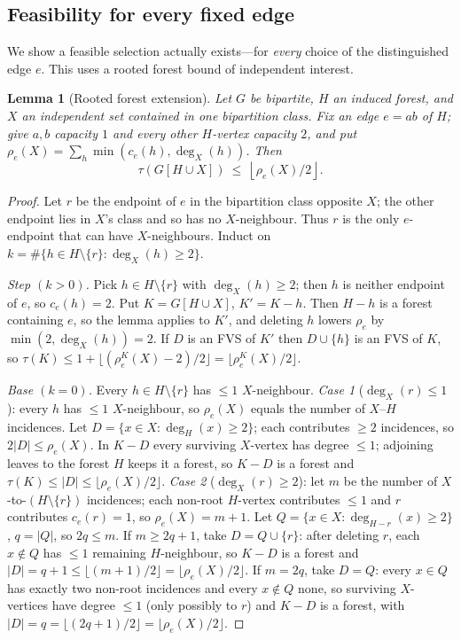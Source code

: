 \documentclass[11pt]{article}
\theoremstyle{plain}
\newtheorem{lemma}[theorem]{Lemma}
\theoremstyle{definition}
\newcommand{\FVS}{\tau}
\begin{document}
\subsection{Feasibility for every fixed edge}\label{sub:C5b}
We show a feasible selection actually exists---for \emph{every} choice of the
distinguished edge $e$. This uses a rooted forest bound of independent interest.

\begin{lemma}[Rooted forest extension]\label{lem:C5b}
Let $G$ be bipartite, $H$ an induced forest, and $X$ an independent set contained
in one bipartition class. Fix an edge $e=ab$ of $H$; give $a,b$ capacity $1$ and
every other $H$-vertex capacity $2$, and put
$\rho_e(X)=\sum_{h}\min(c_e(h),\deg_X(h))$. Then
\[
\FVS\!\left(G[H\cup X]\right)\ \le\ \left\lfloor \rho_e(X)/2\right\rfloor .
\]
\end{lemma}

\begin{proof}
Let $r$ be the endpoint of $e$ in the bipartition class opposite $X$; the other
endpoint lies in $X$'s class and so has no $X$-neighbour. Thus $r$ is the only
$e$-endpoint that can have $X$-neighbours. Induct on
$k=\#\{h\in H\setminus\{r\}:\deg_X(h)\ge2\}$.

\emph{Step $(k>0)$.} Pick $h\in H\setminus\{r\}$ with $\deg_X(h)\ge2$; then $h$
is neither endpoint of $e$, so $c_e(h)=2$. Put $K=G[H\cup X]$, $K'=K-h$. Then
$H-h$ is a forest containing $e$, so the lemma applies to $K'$, and deleting $h$
lowers $\rho_e$ by $\min(2,\deg_X(h))=2$. If $D$ is an FVS of $K'$ then
$D\cup\{h\}$ is an FVS of $K$, so
$\FVS(K)\le1+\lfloor(\rho_e^{K}(X)-2)/2\rfloor=\lfloor\rho_e^{K}(X)/2\rfloor$.

\emph{Base $(k=0)$.} Every $h\in H\setminus\{r\}$ has $\le1$ $X$-neighbour.
\emph{Case 1} ($\deg_X(r)\le1$): every $h$ has $\le1$ $X$-neighbour, so
$\rho_e(X)$ equals the number of $X$--$H$ incidences. Let $D=\{x\in X:\deg_H(x)
\ge2\}$; each contributes $\ge2$ incidences, so $2|D|\le\rho_e(X)$. In $K-D$ every
surviving $X$-vertex has degree $\le1$; adjoining leaves to the forest $H$ keeps
it a forest, so $K-D$ is a forest and
$\FVS(K)\le|D|\le\lfloor\rho_e(X)/2\rfloor$.
\emph{Case 2} ($\deg_X(r)\ge2$): let $m$ be the number of $X$-to-$(H\setminus
\{r\})$ incidences; each non-root $H$-vertex contributes $\le1$ and $r$
contributes $c_e(r)=1$, so $\rho_e(X)=m+1$. Let $Q=\{x\in X:\deg_{H-r}(x)\ge2\}$,
$q=|Q|$, so $2q\le m$. If $m\ge2q+1$, take $D=Q\cup\{r\}$: after deleting $r$,
each $x\notin Q$ has $\le1$ remaining $H$-neighbour, so $K-D$ is a forest and
$|D|=q+1\le\lfloor(m+1)/2\rfloor=\lfloor\rho_e(X)/2\rfloor$. If $m=2q$, take
$D=Q$: every $x\in Q$ has exactly two non-root incidences and every $x\notin Q$
none, so surviving $X$-vertices have degree $\le1$ (only possibly to $r$) and
$K-D$ is a forest, with $|D|=q=\lfloor(2q+1)/2\rfloor=\lfloor\rho_e(X)/2\rfloor$.
\end{proof}
\end{document}

